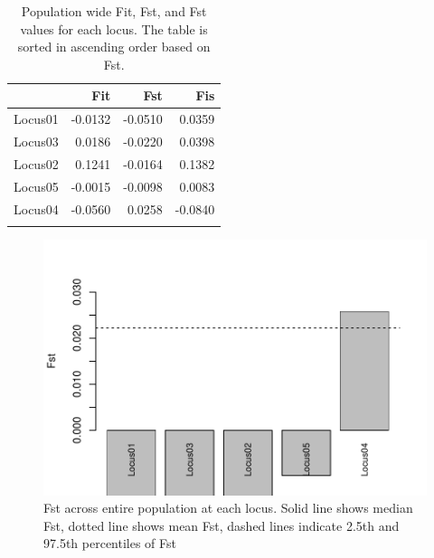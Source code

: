 \documentclass[a4paper]{scrartcl}\usepackage[]{graphicx}\usepackage[]{color}
\makeatletter
\def\maxwidth{ %
  \ifdim\Gin@nat@width>\linewidth
    \linewidth
  \else
    \Gin@nat@width
  \fi
}
\newenvironment{knitrout}{}{} %
\makeatother
\begin{document}
\begin{table}[ht]
\centering
\begin{tabular}{rrrr}
  \hline
 & Fit & Fst & Fis \\ 
  \hline
Locus01 & -0.0132 & -0.0510 & 0.0359 \\ 
   \rowcolor[gray]{0.9} Locus03 & 0.0186 & -0.0220 & 0.0398 \\ 
  Locus02 & 0.1241 & -0.0164 & 0.1382 \\ 
   \rowcolor[gray]{0.9} Locus05 & -0.0015 & -0.0098 & 0.0083 \\ 
  Locus04 & -0.0560 & 0.0258 & -0.0840 \\ 
   \rowcolor[gray]{0.9}  \hline
\end{tabular}
\caption{Population wide Fit, Fst, and Fst values for each locus. The table is sorted in ascending order based on Fst.} 
\end{table}


\begin{knitrout}
\color{fgcolor}\begin{figure}
\includegraphics[width=\maxwidth]{PopGenReport-pop_locus_fst-1} \caption[Fst across entire population at each locus]{Fst across entire population at each locus. Solid line shows median Fst, dotted line shows mean Fst, dashed lines indicate 2.5th and 97.5th percentiles of Fst}\label{fig:pop_locus_fst}
\end{figure}


\end{knitrout}
\FloatBarrier
\end{document}
